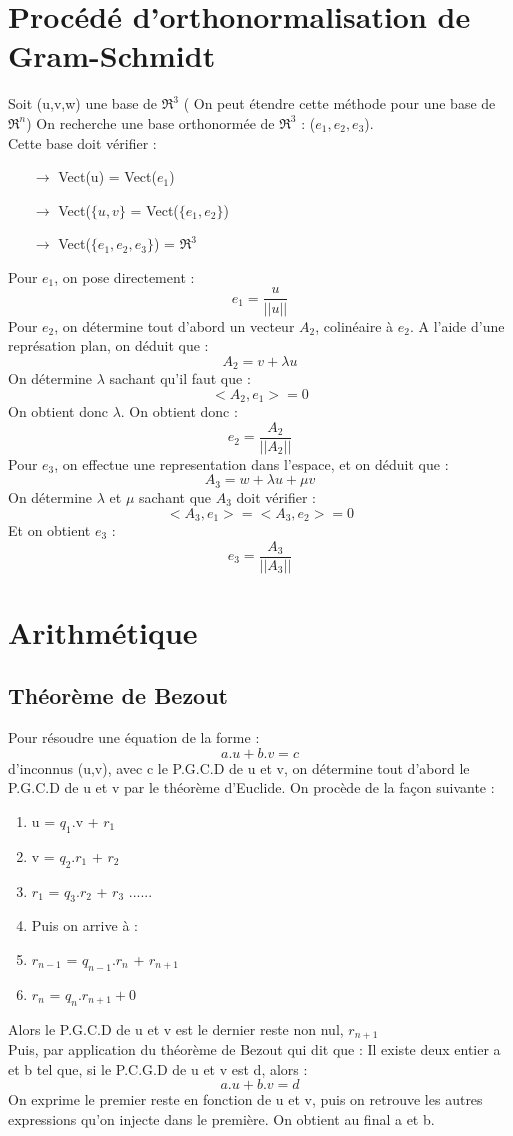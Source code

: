 \documentclass[a4paper,12 pt,oneside]{report}     %
\begin{document}
\chapter{Procédé d'orthonormalisation de Gram-Schmidt}
Soit (u,v,w) une base de $\Re^3$ ( On peut étendre cette méthode pour une base de $\Re^n$)
On recherche une base orthonormée de $\Re^3$ : ($e_1,e_2,e_3$).\\
Cette base doit vérifier : 
\begin{itemize}
 \item[$\rightarrow$]Vect(u) = Vect($e_1$)
 \item[$\rightarrow$]Vect($\{u,v\}$ = Vect($\{e_1,e_2\}$)
 \item[$\rightarrow$]Vect($\{e_1,e_2,e_3\}$) = $\Re^3$
\end{itemize}
Pour $e_1$, on pose directement : 
$$e_1 = \dfrac{u}{||u||}$$
Pour $e_2$, on détermine tout d'abord un vecteur $A_2$, colinéaire à $e_2$. A l'aide d'une représation plan, on déduit que : 
$$A_2 = v + \lambda u$$
On détermine $\lambda$ sachant qu'il faut que : $$<A_2,e_1> = 0$$
On obtient donc $\lambda$. On obtient donc : 
$$e_2 = \dfrac{A_2}{||A_2||}$$
Pour $e_3$, on effectue une representation dans l'espace, et on déduit que :
$$A_3 = w + \lambda u + \mu v$$
On détermine $\lambda$ et $\mu$ sachant que $A_3$ doit vérifier : 
$$<A_3,e_1> = <A_3,e_2> = 0$$
Et on obtient $e_3$ : 
$$e_3 = \dfrac{A_3}{||A_3||}$$
\chapter{Arithmétique}
\section{Théorème de Bezout}
Pour résoudre une équation de la forme : 
$$a.u+b.v = c$$ 
d'inconnus (u,v), avec c le P.G.C.D de u et v, on détermine tout d'abord le P.G.C.D de u et v par le théorème d'Euclide. On procède de la façon suivante : 
\begin{enumerate}[1-]
 \item u = $q_1$.v + $r_1$
 \item v = $q_2$.$r_1$ + $r_2$
 \item $r_1$ = $q_3$.$r_2$ + $r_3$ ......
 \item Puis on arrive à : 
 \item $r_{n-1}$ = $q_{n-1}$.$r_n$ + $r_{n+1}$
 \item $r_n$ = $q_n.r_{n+1} + 0$
\end{enumerate}
Alors le P.G.C.D de u et v est le dernier reste non nul, $r_{n+1}$\\
Puis, par application du théorème de Bezout qui dit que : Il existe deux entier a et b tel que, si le P.C.G.D de u et v est d, alors : 
$$a.u+b.v = d$$
On exprime le premier reste en fonction de u et v, puis on retrouve les autres expressions qu'on injecte dans le première. On obtient au final a et b.
\end{document}
